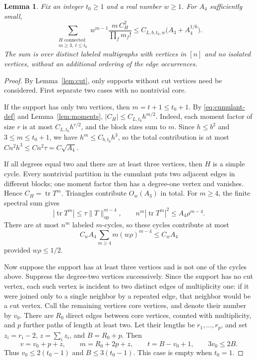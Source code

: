 \documentclass[11pt,reqno]{amsart}
\numberwithin{equation}{section}
\newtheorem{lemma}[theorem]{Lemma}
\theoremstyle{definition}
\theoremstyle{remark}
\theoremstyle{definition}
\DeclareMathOperator{\tr}{tr}
\begin{document}
\begin{lemma}\label{lem:core-sum}
Fix an integer $t_0\ge1$ and a real number $w\ge1$. For $A_4$ sufficiently small,
\begin{equation}\label{eq:core-sum}
 \sum_{\substack{H\text{ connected}\\m\ge3,\ t\le t_0}}
       w^{m-1}\frac{m\,C_H^2}{\prod_fm_f!}
 \le C_{L,b,t_0,w}\bigl(A_3+A_4^{1/6}\bigr).
\end{equation}
The sum is over distinct labeled multigraphs with vertices in $[n]$ and no isolated vertices,
without an additional ordering of the edge occurrences.
\end{lemma}
\begin{proof}
By Lemma~\ref{lem:cut}, only supports without cut vertices need be considered.
First separate two cases with no nontrivial core.

If the support has only two vertices, then $m=t+1\le t_0+1$.
By \eqref{eq:cumulant-def} and Lemma~\ref{lem:moments},
$|C_H|\le C_{L,t_0}h^{m/2}$.
Indeed, each moment factor of size $r$ is at most $C_{L,t_0}h^{r/2}$,
and the block sizes sum to $m$.
Since $h\le b^2$ and $3\le m\le t_0+1$, we have $h^m\le C_{b,t_0}h^3$, so the total contribution is at most
$C n^2h^3\le C n^2\tau=C\sqrt{A_4}$.

If all degrees equal two and there are at least three vertices,
then $H$ is a simple cycle. Every nontrivial partition in the cumulant
puts two adjacent edges in different blocks; one moment factor then has a degree-one vertex and vanishes.
Hence $C_H=\tr T^m$. Triangles contribute $O_w(A_3)$ in total.
For $m\ge4$, the finite spectral sum gives
\[
 |\tr T^m|\le \tau\|T\|_{\mathrm{op}}^{m-4},
 \qquad n^m|\tr T^m|^2\le A_4\rho^{m-4}.
\]
There are at most $n^m$ labeled $m$-cycles, so these cycles contribute at most
\[
 C_w A_4\sum_{m\ge4}m(w\rho)^{m-4}\le C_wA_4
\]
provided $w\rho\le1/2$.

Now suppose the support has at least three vertices and is not one of the cycles above.
Suppress the degree-two vertices successively. Since the support has no cut vertex,
each such vertex is incident to two distinct edges of multiplicity one: if it were joined only to a single neighbor by a repeated edge,
that neighbor would be a cut vertex. Call the remaining vertices core vertices, and denote their number by $v_0$.
There are $R_0$ direct edges between core vertices, counted with multiplicity, and $p$ further paths
of length at least two. Let their lengths be $r_1,\ldots,r_p$,
and set $z_i=r_i-2$, $z=\sum_i z_i$, and $B=R_0+p$.
Then
\begin{equation}\label{eq:core-counts}
 v=v_0+p+z,\qquad m=R_0+2p+z,\qquad
 t=B-v_0+1,\qquad 3v_0\le2B.
\end{equation}
Thus $v_0\le2(t_0-1)$ and $B\le3(t_0-1)$.
This case is empty when $t_0=1$.


\end{proof}
\end{document}
